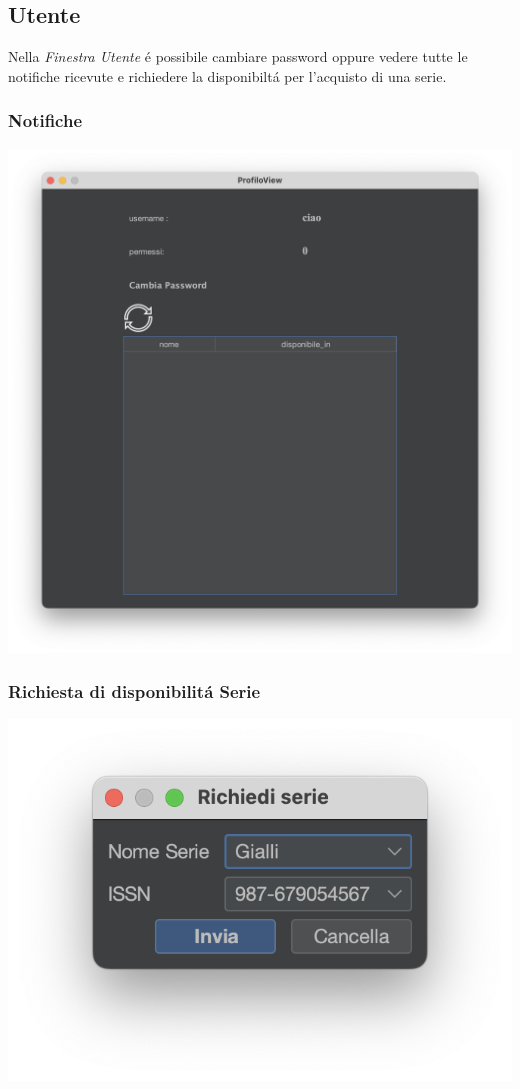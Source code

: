  \subsection{Utente}
 Nella \textit{Finestra Utente} \'e possibile cambiare password oppure vedere tutte le notifiche ricevute e richiedere la disponibilt\'a per l'acquisto di una serie.
 \subsubsection{Notifiche}
 \includegraphics[scale=0.25, center]{Immagini/Schermate/Utente/NotificheUtente.png}
 \subsubsection{Richiesta di disponibilit\'a Serie}
 \includegraphics[scale=0.50, center]{Immagini/Schermate/Utente/RichiediDisponibilita.png}